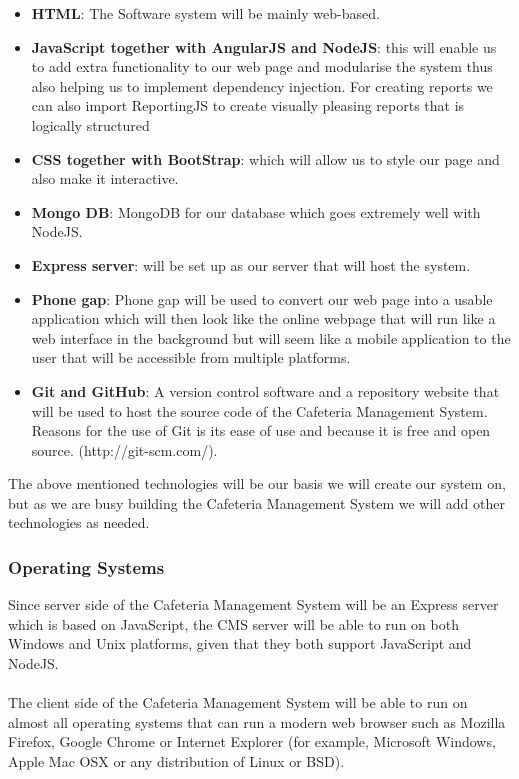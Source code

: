 \documentclass[a4paper,12pt]{article}
\begin{document}
\begin{itemize}
  \item \textbf{HTML}: The Software system will be mainly web-based.

  \item \textbf{JavaScript together with AngularJS  and NodeJS}: this will enable us to add extra functionality to our web page and modularise the system thus also helping us to implement dependency injection. For creating reports we can also import ReportingJS to create visually pleasing reports that is logically structured

 \item \textbf{CSS together with BootStrap}: which will allow us to style our page and also make it interactive.

 \item \textbf{Mongo DB}: MongoDB for our database which goes extremely well with NodeJS. 

 \item \textbf{Express server}: will be set up as our server that will host the system.

 \item \textbf{Phone gap}: Phone gap will be used to convert our web page into a usable application which will then look like the online webpage that will run like a web interface in the background but  will seem like a mobile application to the user that will be accessible from multiple platforms.

\item \textbf{Git and GitHub}: A version control software and a repository website that will be used to host the source code of the Cafeteria Management System. Reasons for the use of Git is its ease of use and because it is free and open source. (http://git-scm.com/).

\end{itemize}
The above mentioned technologies will be our basis we will create our system on, but as we are busy building the Cafeteria Management System we will add other technologies as needed. 

\subsubsection{Operating Systems}
Since server side of the Cafeteria Management System will be an Express server which is based on JavaScript, the CMS server will be able to run on both Windows and Unix platforms, given that they both support JavaScript and NodeJS.\\
\\
The client side of the Cafeteria Management System will be able to run on almost all operating systems that can run a modern web browser such as Mozilla Firefox, Google Chrome or Internet Explorer (for example, Microsoft Windows, Apple Mac OSX or any distribution of Linux or BSD).
\end{document}
